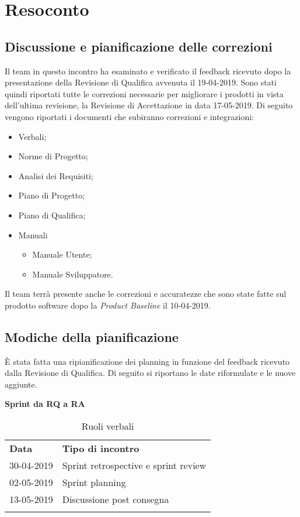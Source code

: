 \clearpage
\section{Resoconto}
	\subsection{Discussione e pianificazione delle correzioni}
	\label{sec:correzioni}
	Il team in questo incontro ha esaminato e verificato il feedback ricevuto dopo la presentazione della Revisione di Qualifica avvenuta il 19-04-2019. Sono stati quindi riportati tutte le correzioni necessarie per migliorare i prodotti in vista dell'ultima revisione, la Revisione di Accettazione in data 17-05-2019. Di seguito vengono riportati i documenti che subiranno correzioni e integrazioni:
	\begin{itemize}
		\item Verbali;
		\item Norme di Progetto;
		\item Analisi dei Requisiti;
		\item Piano di Progetto;
		\item Piano di Qualifica;
		\item Manuali
			\begin{itemize}
				\item Manuale Utente;
				\item Manuale Sviluppatore.
			\end{itemize}
	\end{itemize}
	Il team terrà presente anche le correzioni e accuratezze che sono state fatte sul prodotto software dopo la \textit{Product Baseline} il 10-04-2019.
	\subsection{Modiche della pianificazione}
	\label{sec:pianificazione}
	È stata fatta una ripianificazione dei planning in funzione del feedback ricevuto dalla Revisione di Qualifica. Di seguito si riportano le date riformulate e le nuove aggiunte.
	\begin{center}
		\textbf{Sprint da RQ a RA}
		\renewcommand{\arraystretch}{1.5}
		\begin{longtable}{  p{2.5cm} p{6cm} }
			\rowcolor{tableHeadYellow}
			\textbf{Data}&\textbf{Tipo di incontro}\\
			30-04-2019 & Sprint retrospective e sprint review \\
			02-05-2019 & Sprint planning\\
			13-05-2019 & Discussione post consegna\\
			\rowcolor{white}
			\caption{Ruoli verbali}
			\label{sec:tabella2}
		\end{longtable}	
	\end{center}